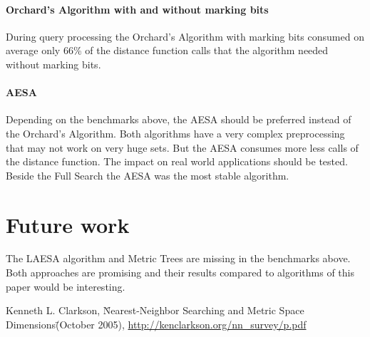 \documentclass[runningheads,a4paper]{llncs}
\begin{document}
\paragraph{Orchard’s Algorithm with and without marking bits} During query processing the Orchard’s Algorithm with
marking bits consumed on average only 66\% of the distance function calls that the algorithm needed without marking
bits.

\paragraph{AESA} Depending on the benchmarks above, the AESA should be preferred instead of the Orchard’s Algorithm.
Both algorithms have a very complex preprocessing that may not work on very huge sets. But the AESA consumes more less
calls of the distance function. The impact on real world applications should be tested. Beside the Full Search the AESA
was the most stable algorithm.

\section{Future work}

The LAESA algorithm and Metric Trees are missing in the benchmarks above. Both approaches are promising and their
results compared to algorithms of this paper would be interesting.

\begin{thebibliography}{4}
	 Kenneth L. Clarkson, \"Nearest-Neighbor Searching and Metric Space Dimensions\" (October 2005), \url{http://kenclarkson.org/nn_survey/p.pdf}
\end{thebibliography}
\end{document}
